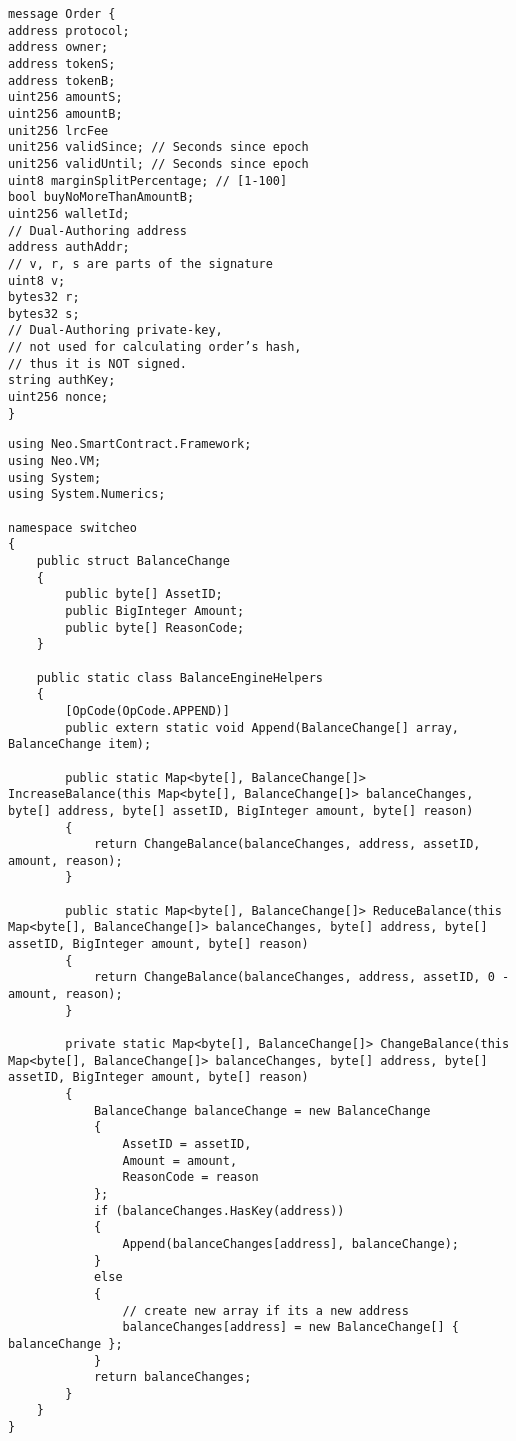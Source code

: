 \documentclass{article}
\begin{document}
\begin{lstlisting}
message Order {
address protocol;
address owner;
address tokenS;
address tokenB;
uint256 amountS;
uint256 amountB;
unit256 lrcFee
unit256 validSince; // Seconds since epoch
unit256 validUntil; // Seconds since epoch
uint8 marginSplitPercentage; // [1-100]
bool buyNoMoreThanAmountB;
uint256 walletId;
// Dual-Authoring address
address authAddr;
// v, r, s are parts of the signature
uint8 v;
bytes32 r;
bytes32 s;
// Dual-Authoring private-key,
// not used for calculating order’s hash,
// thus it is NOT signed.
string authKey;
uint256 nonce;
}
\end{lstlisting}
\begin{lstlisting}
using Neo.SmartContract.Framework;
using Neo.VM;
using System;
using System.Numerics;

namespace switcheo
{
    public struct BalanceChange
    {
        public byte[] AssetID;
        public BigInteger Amount;
        public byte[] ReasonCode;
    }

    public static class BalanceEngineHelpers
    {
        [OpCode(OpCode.APPEND)]
        public extern static void Append(BalanceChange[] array, BalanceChange item);

        public static Map<byte[], BalanceChange[]> IncreaseBalance(this Map<byte[], BalanceChange[]> balanceChanges, byte[] address, byte[] assetID, BigInteger amount, byte[] reason)
        {
            return ChangeBalance(balanceChanges, address, assetID, amount, reason);
        }

        public static Map<byte[], BalanceChange[]> ReduceBalance(this Map<byte[], BalanceChange[]> balanceChanges, byte[] address, byte[] assetID, BigInteger amount, byte[] reason)
        {
            return ChangeBalance(balanceChanges, address, assetID, 0 - amount, reason);
        }

        private static Map<byte[], BalanceChange[]> ChangeBalance(this Map<byte[], BalanceChange[]> balanceChanges, byte[] address, byte[] assetID, BigInteger amount, byte[] reason)
        {
            BalanceChange balanceChange = new BalanceChange
            {
                AssetID = assetID,
                Amount = amount,
                ReasonCode = reason
            };
            if (balanceChanges.HasKey(address))
            {
                Append(balanceChanges[address], balanceChange);
            }
            else
            {
                // create new array if its a new address
                balanceChanges[address] = new BalanceChange[] { balanceChange };
            }
            return balanceChanges;
        }
    }
}
\end{lstlisting}
\end{document}

